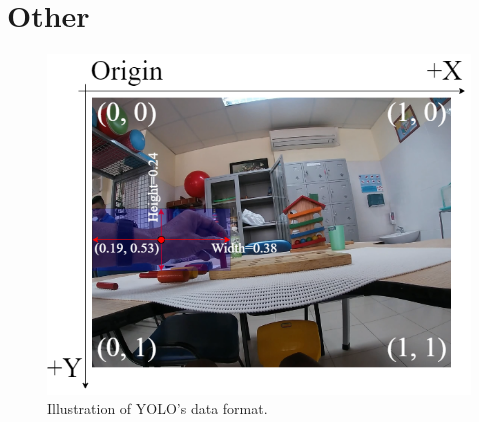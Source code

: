 \section{Other}
\begin{figure}
	\centerline{\includegraphics[width=0.5\linewidth]{Figs/yoloformat.png}}
	\caption{Illustration of YOLO’s data format.}
	\label{fig:yoloformat}
\end{figure}

